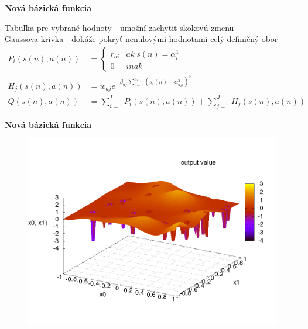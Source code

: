 \documentclass[xcolor=dvipsnames]{beamer}
\begin{document}
\begin{frame}{\bf Nová bázická funkcia}

Tabuľka pre vybrané hodnoty - umožní zachytit skokovú zmenu \\
Gaussova krivka - dokáže pokryť nenulovými hodnotami celý definičný obor \\

\begin{align}
P_i(s(n), a(n)) &=
\left\{
	\begin{array}{ll}
		r_{ai}  & ak \ s(n) = \alpha^1_i \\
		0 & inak
	\end{array}
\right. \\
  H_j(s(n), a(n)) &= w_{aj} e^{ -\beta_{aj} \sum\limits_{i=1}^{n_s}{(s_i(n) - \alpha^2_{aji})^2 }} \\
  Q(s(n), a(n)) &= \sum\limits_{i=1}^{I} P_i(s(n),a(n)) + \sum\limits_{j=1}^{J} H_j(s(n), a(n))
  \label{eq:peak_hill}
\end{align}


\end{frame}


\begin{frame}{\bf Nová bázická funkcia}

\begin{figure}[!htb]
\centering
\includegraphics[scale=.4]{../pictures/peak_hill_function.png}
\end{figure}

\end{frame}
\end{document}
